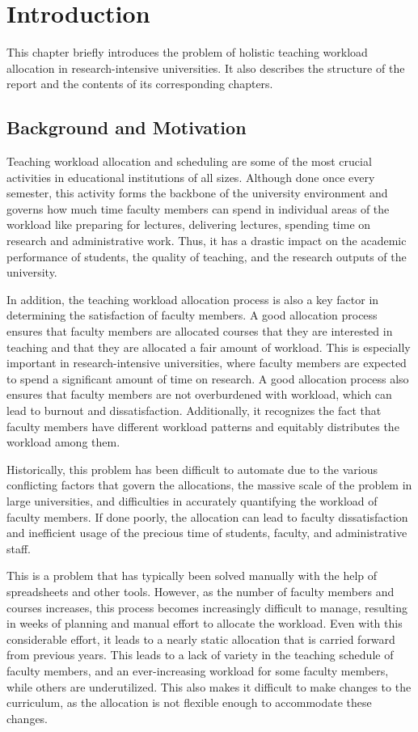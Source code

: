 \chapter{Introduction}

This chapter briefly introduces the problem of holistic teaching workload allocation in research-intensive universities. It also describes the structure of the report and the contents of its corresponding chapters.

\section{Background and Motivation}

Teaching workload allocation and scheduling are some of the most crucial activities in educational institutions of all sizes. Although done once every semester, this activity forms the backbone of the university environment and governs how much time faculty members can spend in individual areas of the workload like preparing for lectures, delivering lectures, spending time on research and administrative work. Thus, it has a drastic impact on the academic performance of students, the quality of teaching, and the research outputs of the university.

In addition, the teaching workload allocation process is also a key factor in determining the satisfaction of faculty members. A good allocation process ensures that faculty members are allocated courses that they are interested in teaching and that they are allocated a fair amount of workload. This is especially important in research-intensive universities, where faculty members are expected to spend a significant amount of time on research. A good allocation process also ensures that faculty members are not overburdened with workload, which can lead to burnout and dissatisfaction. Additionally, it recognizes the fact that faculty members have different workload patterns and equitably distributes the workload among them.

Historically, this problem has been difficult to automate due to the various conflicting factors that govern the allocations, the massive scale of the problem in large universities, and difficulties in accurately quantifying the workload of faculty members. If done poorly, the allocation can lead to faculty dissatisfaction and inefficient usage of the precious time of students, faculty, and administrative staff.

This is a problem that has typically been solved manually with the help of spreadsheets and other tools. However, as the number of faculty members and courses increases, this process becomes increasingly difficult to manage, resulting in weeks of planning and manual effort to allocate the workload. Even with this considerable effort, it leads to a nearly static allocation that is carried forward from previous years. This leads to a lack of variety in the teaching schedule of faculty members, and an ever-increasing workload for some faculty members, while others are underutilized. This also makes it difficult to make changes to the curriculum, as the allocation is not flexible enough to accommodate these changes.

